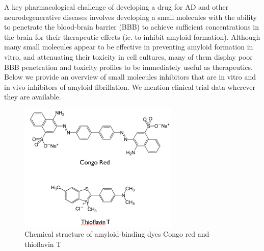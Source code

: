 A key pharmacological challenge of developing a drug for AD and other neurodegenerative diseases involves developing a small molecules with the ability to penetrate the blood-brain barrier (BBB) to achieve sufficient concentrations in the brain for their therapeutic effects (ie. to inhibit amyloid formation). Although many small molecules appear to be effective in preventing amyloid formation in vitro, and attenuating their toxicity in cell cultures, many of them display poor BBB penetration and toxicity profiles to be immediately useful as therapeutics.
Below we provide an overview of small molecules inhibitors that are in vitro and in vivo inhibitors of amyloid fibrillation.  We mention clinical trial data wherever they are available.

\begin{figure}
\centering
\includegraphics[width=3in]{figures/introduction/dyes.png}
\caption[Amyloid-binding dyes]{Chemical structure of amyloid-binding dyes Congo red and thioflavin T}
\label{fig:amyloid_dyes}
\end{figure}


